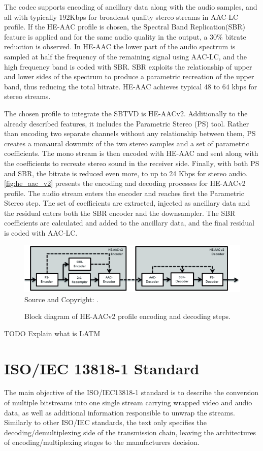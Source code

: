 \documentclass[
	12pt,				%
	openright,			%
	twoside,			%
	a4paper,			%
	brazil,
	french,				%
	english
	]{abntex2}
\begin{document}
The codec supports encoding of ancillary data along with the audio samples, and all with typically 192Kbps for broadcast quality stereo streams in AAC-LC profile. If the HE-AAC profile is chosen, the Spectral Band Replication(SBR) feature is applied and for the same audio quality in the output, a 30\% bitrate reduction is observed. In HE-AAC the lower part of the audio spectrum is sampled at half the frequency of the remaining signal using AAC-LC, and the high frequency band is coded with SBR. SBR exploits the relationship of upper and lower sides of the spectrum to produce a parametric recreation of the upper band, thus reducing the total bitrate. HE-AAC achieves typical 48 to 64 kbps for stereo streams.

The chosen profile to integrate the SBTVD is HE-AACv2. Additionally to the already described features, it includes the Parametric Stereo (PS) tool. Rather than encoding two separate channels without any relationship between them, PS creates a monaural downmix of the two stereo samples and a set of parametric coefficients. The mono stream is then encoded with HE-AAC and sent along with the coefficients to recreate stereo sound in the receiver side. Finally, with both PS and SBR, the bitrate is reduced even more, to up to 24 Kbps for stereo audio. \autoref{fig:he_aac_v2} presents the encoding and decoding processes for HE-AACv2 profile. The audio stream enters the encoder and reaches first the Parametric Stereo step. The set of coefficients are extracted, injected as ancillary data and the residual enters both the SBR encoder and the downsampler. The SBR coefficients are calculated and added to the ancillary data, and the final residual is coded with AAC-LC.

\begin{figure}
\centering
\caption{Block diagram of HE-AACv2 profile encoding and decoding steps.}
\includegraphics[width=1\linewidth]{figuras/he_aac_v2.png}
\\Source and Copyright: \cite{fraunhofer}.
\label{fig:he_aac_v2}
\end{figure}

TODO Explain what is LATM

\chapter{ISO/IEC 13818-1 Standard}
The main objective of the ISO/IEC13818-1 standard is to describe the conversion of multiple bitstreams into one single stream carrying wrapped video and audio data, as well as additional information responsible to unwrap the streams. Similarly to other ISO/IEC standards, the text only specifies the decoding/demultiplexing side of the transmission chain, leaving the architectures of encoding/multiplexing stages to the manufacturers decision.
\end{document}
